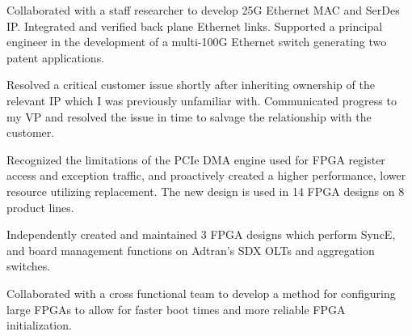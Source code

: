 \documentclass[10pt]{deedy-resume-reversed}
\begin{document}
\begin{minipage}[t]{1.0\textwidth}
\begin{tightemize}
Collaborated with a staff researcher to develop 25G Ethernet MAC and SerDes IP.
Integrated and verified back plane Ethernet links.
Supported a principal engineer in the development of a multi-100G Ethernet switch generating two patent applications.
\item Resolved a critical customer issue shortly after inheriting ownership of the relevant IP which I was previously unfamiliar with. 
Communicated progress to my VP and resolved the issue in time to salvage the relationship with the customer.
\item Recognized the limitations of the PCIe DMA engine used for FPGA register access and exception traffic, 
and proactively created a higher performance, lower resource utilizing replacement. The new design is used in 14 FPGA designs on 8 product lines.
\item Independently created and maintained 3 FPGA designs which perform SyncE, and board management functions on Adtran's SDX OLTs and aggregation switches. 
\item Collaborated with a cross functional team to develop a method for configuring large FPGAs to allow for faster boot times and more reliable FPGA initialization.
\end{tightemize}
\sectionsep


\end{minipage}
\end{document}
